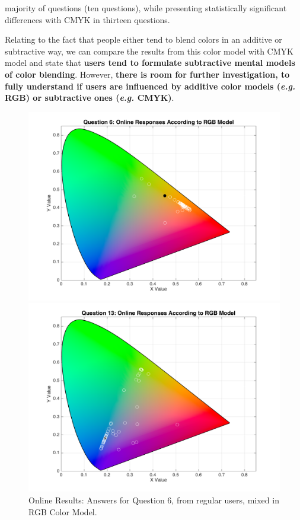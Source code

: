 majority of questions (ten questions), while presenting statistically significant differences with CMYK in thirteen questions. \par
%
Relating to the fact that people either tend to blend colors in an additive or subtractive way, we can compare the results from this color model with CMYK model and state that \textbf{users tend to formulate subtractive mental models of color
blending}. However, \textbf{there is room for further investigation, to fully understand if users are influenced by additive color models (\emph{e.g.} RGB) or subtractive ones (\emph{e.g.} CMYK)}. \par
%
\begin{figure}[!htbp]
  \centering
  \begin{minipage}{0.48\textwidth}
    \centering
    \includegraphics[width=\textwidth]{images/results/6_online_RGBresponses.png}
    \caption[Online Results: Answers for Question 6, from regular users, mixed in RGB Color Model.]{Online Results: Answers for Question 6, from regular users, mixed in RGB Color Model.}
    \label{fig:onlinergbregular_6}
  \end{minipage}\hfill
  \begin{minipage}{0.48\textwidth}
    \centering
    \includegraphics[width=\textwidth]{images/results/13_online_RGBresponses.png}

\end{minipage}
\end{figure}
